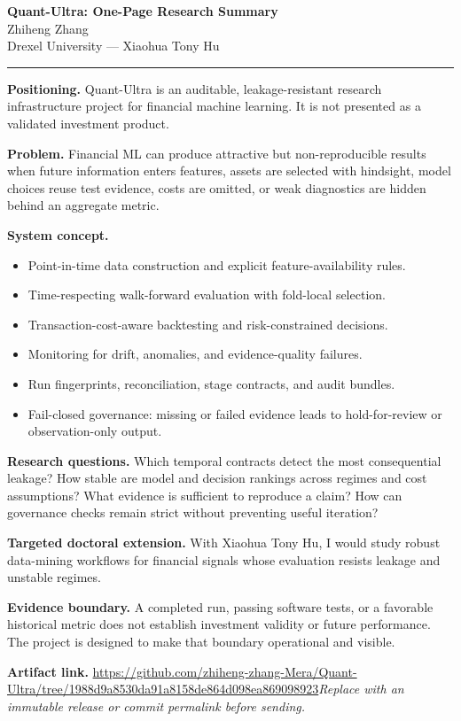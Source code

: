 \documentclass[11pt]{article}
\newcommand{\ApplicantName}{Zhiheng Zhang}
\newcommand{\ApplicantGitHub}{\url{https://github.com/zhiheng-zhang-Mera/Quant-Ultra/tree/1988d9a8530da91a8158de864d098ea869098923}}
\begin{document}
\begin{center}
{\LARGE\bfseries Quant-Ultra: One-Page Research Summary}\\[0.25em]
{\large \ApplicantName}\\
Drexel University --- Xiaohua Tony Hu
\end{center}
\vspace{0.35em}\hrule\vspace{0.65em}

\textbf{Positioning.} Quant-Ultra is an auditable, leakage-resistant research infrastructure project for financial machine learning. It is not presented as a validated investment product.

\textbf{Problem.} Financial ML can produce attractive but non-reproducible results when future information enters features, assets are selected with hindsight, model choices reuse test evidence, costs are omitted, or weak diagnostics are hidden behind an aggregate metric.

\textbf{System concept.}
\begin{itemize}
\item Point-in-time data construction and explicit feature-availability rules.
\item Time-respecting walk-forward evaluation with fold-local selection.
\item Transaction-cost-aware backtesting and risk-constrained decisions.
\item Monitoring for drift, anomalies, and evidence-quality failures.
\item Run fingerprints, reconciliation, stage contracts, and audit bundles.
\item Fail-closed governance: missing or failed evidence leads to hold-for-review or observation-only output.
\end{itemize}

\textbf{Research questions.} Which temporal contracts detect the most consequential leakage? How stable are model and decision rankings across regimes and cost assumptions? What evidence is sufficient to reproduce a claim? How can governance checks remain strict without preventing useful iteration?

\textbf{Targeted doctoral extension.} With Xiaohua Tony Hu, I would study robust data-mining workflows for financial signals whose evaluation resists leakage and unstable regimes.

\textbf{Evidence boundary.} A completed run, passing software tests, or a favorable historical metric does not establish investment validity or future performance. The project is designed to make that boundary operational and visible.

\textbf{Artifact link.} \ApplicantGitHub\quad \textit{Replace with an immutable release or commit permalink before sending.}
\end{document}
